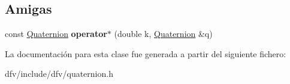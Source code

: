 \subsection*{\-Amigas}
\begin{DoxyCompactItemize}
\item 
\hypertarget{classdfv_1_1Quaternion_ab03e5e86f69c9470e9e5bc0d858e632e}{const \hyperlink{classdfv_1_1Quaternion}{\-Quaternion} {\bfseries operator$\ast$} (double k, \hyperlink{classdfv_1_1Quaternion}{\-Quaternion} \&q)}\label{classdfv_1_1Quaternion_ab03e5e86f69c9470e9e5bc0d858e632e}

\end{DoxyCompactItemize}


\-La documentación para esta clase fue generada a partir del siguiente fichero\-:\begin{DoxyCompactItemize}
\item 
dfv/include/dfv/quaternion.\-h\end{DoxyCompactItemize}
